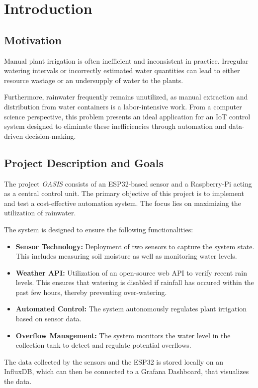 \documentclass[paper=a4,fontsize=12pt,ngerman]{scrartcl}
\begin{document}
\pagestyle{plain}




\clearpage
\tableofcontents 

\clearpage
{}

\section{Introduction}

\subsection{Motivation}
Manual plant irrigation is often inefficient and inconsistent in practice. Irregular watering intervals or incorrectly estimated water quantities can lead to either resource wastage or an undersupply of water to the plants. 

Furthermore, rainwater frequently remains unutilized, as manual extraction and distribution from water containers is a labor-intensive work. From a computer science perspective, this problem presents an ideal application for an IoT control system designed to eliminate these inefficiencies through automation and data-driven decision-making.

\subsection{Project Description and Goals}
The project \emph{OASIS} consists of an ESP32-based sensor and a Raspberry-Pi acting as a central control unit. The primary objective of this project is to implement and test a cost-effective automation system. The focus lies on maximizing the utilization of rainwater.

The system is designed to ensure the following functionalities:

\begin{itemize}
    \item \textbf{Sensor Technology:} Deployment of two sensors to capture the system state. This includes measuring soil moisture as well as monitoring water levels.

    \item \textbf{Weather API:} Utilization of an open-source web API to verify recent rain levels. This ensures that watering is disabled if rainfall has occured within the past few hours, thereby preventing over-watering.
    
    \item \textbf{Automated Control:} The system autonomously regulates plant irrigation based on sensor data.

    \item \textbf{Overflow Management:} The system monitors the water level in the collection tank to detect and regulate potential overflows.
\end{itemize}
The data collected by the sensors and the ESP32 is stored locally on an InfluxDB, which can then be connected to a Grafana Dashboard, that visualizes the data.
\end{document}

